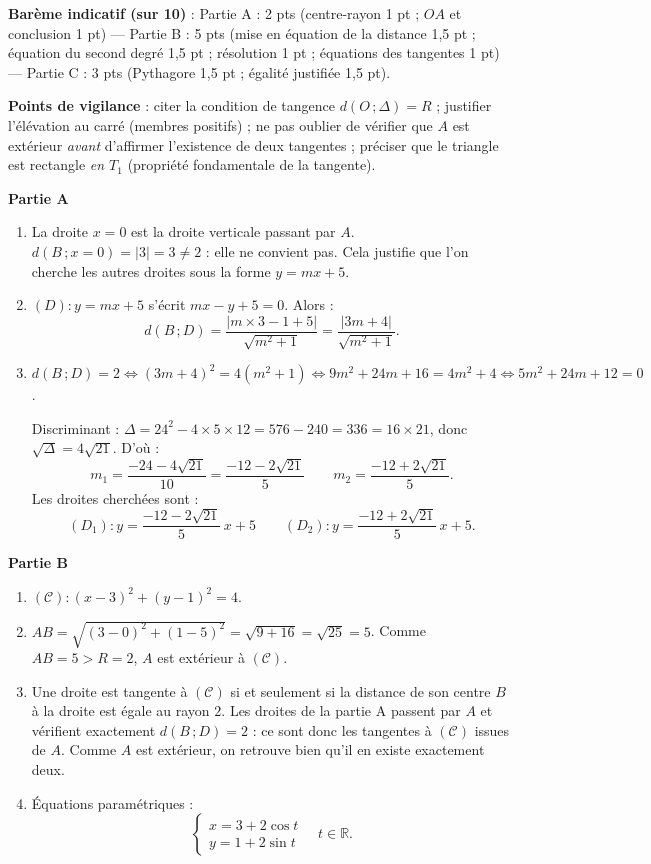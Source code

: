 \documentclass[11pt]{article}
\begin{document}
\begin{corrige}
\textbf{Barème indicatif (sur 10)} : Partie A : 2 pts (centre-rayon 1 pt ; $OA$ et conclusion 1 pt) — Partie B : 5 pts (mise en équation de la distance 1,5 pt ; équation du second degré 1,5 pt ; résolution 1 pt ; équations des tangentes 1 pt) — Partie C : 3 pts (Pythagore 1,5 pt ; égalité justifiée 1,5 pt).

\textbf{Points de vigilance} : citer la condition de tangence $d(O\,;\Delta)=R$ ; justifier l'élévation au carré (membres positifs) ; ne pas oublier de vérifier que $A$ est extérieur \emph{avant} d'affirmer l'existence de deux tangentes ; préciser que le triangle est rectangle \emph{en $T_1$} (propriété fondamentale de la tangente).
\end{corrige}

\begin{corrige}
\textbf{Partie A}
\begin{enumerate}
\item La droite $x=0$ est la droite verticale passant par $A$. $d(B\,;x=0)=|3|=3\neq 2$ : elle ne convient pas. Cela justifie que l'on cherche les autres droites sous la forme $y=mx+5$.
\item $(D):y=mx+5$ s'écrit $mx-y+5=0$. Alors :
\[ d(B\,;D)=\dfrac{|m\times 3-1+5|}{\sqrt{m^2+1}}=\dfrac{|3m+4|}{\sqrt{m^2+1}}. \]
\item $d(B\,;D)=2\iff (3m+4)^2=4(m^2+1)\iff 9m^2+24m+16=4m^2+4\iff 5m^2+24m+12=0$.

Discriminant : $\Delta=24^2-4\times 5\times 12=576-240=336=16\times 21$, donc $\sqrt{\Delta}=4\sqrt{21}$. D'où :
\[ m_1=\dfrac{-24-4\sqrt{21}}{10}=\dfrac{-12-2\sqrt{21}}{5} \qquad m_2=\dfrac{-12+2\sqrt{21}}{5}. \]
Les droites cherchées sont :
\[ (D_1):y=\dfrac{-12-2\sqrt{21}}{5}\,x+5 \qquad (D_2):y=\dfrac{-12+2\sqrt{21}}{5}\,x+5. \]
\end{enumerate}

\textbf{Partie B}
\begin{enumerate}
\item $(\mathscr{C}):(x-3)^2+(y-1)^2=4$.
\item $AB=\sqrt{(3-0)^2+(1-5)^2}=\sqrt{9+16}=\sqrt{25}=5$. Comme $AB=5>R=2$, $A$ est extérieur à $(\mathscr{C})$.
\item Une droite est tangente à $(\mathscr{C})$ si et seulement si la distance de son centre $B$ à la droite est égale au rayon $2$. Les droites de la partie A passent par $A$ et vérifient exactement $d(B\,;D)=2$ : ce sont donc les tangentes à $(\mathscr{C})$ issues de $A$. Comme $A$ est extérieur, on retrouve bien qu'il en existe exactement deux.
\item Équations paramétriques :
\[ \begin{cases} x=3+2\cos t \\ y=1+2\sin t \end{cases} \quad t\in\mathbb{R}. \]
\end{enumerate}


\end{corrige}
\end{document}
